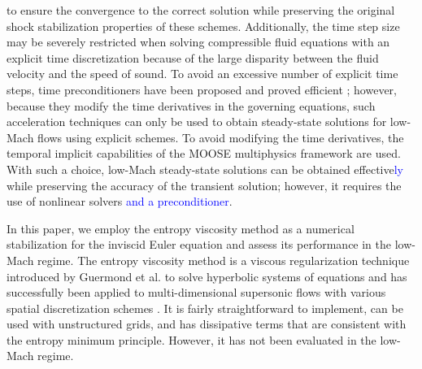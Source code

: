 \documentclass[preprint,10pt]{elsarticle}
\newcommand{\tcr}[1]{\textcolor{red}{#1}}
\newcommand{\tcb}[1]{\textcolor{blue}{#1}}
\begin{document}
to ensure the convergence to the correct solution while preserving the original shock stabilization 
properties of these schemes. 
%
Additionally, the time step size may be severely restricted when solving compressible fluid equations with an explicit time discretization 
because of the large disparity between the fluid velocity and the speed of sound. 
To avoid an excessive number of explicit time steps, time preconditioners have been proposed and proved efficient \cite{LowMach2};
however, because they modify the time derivatives in the governing equations, such acceleration techniques can only be used to obtain
steady-state solutions for low-Mach flows using explicit schemes.
To avoid modifying the time derivatives, 
the temporal implicit capabilities of the MOOSE multiphysics framework \cite{MOOSE} are used. With such a choice, low-Mach steady-state solutions 
can be obtained effective\tcb{ly} while preserving the accuracy of the transient solution; however, it requires the use of nonlinear solvers \tcb{and a preconditioner}.

In this paper, we employ the entropy viscosity method as a numerical stabilization for the inviscid Euler equation and assess its performance 
in the low-Mach regime. 
The entropy viscosity method is a viscous regularization technique introduced by Guermond et al. to solve hyperbolic systems of equations
and has successfully been applied to multi-dimensional supersonic flows with various spatial discretization schemes \cite{jlg}. 
It is fairly straightforward to implement, can be used with unstructured grids, and has dissipative terms that are consistent with the 
entropy minimum principle. However, it has not been evaluated in the low-Mach regime.
\end{document}
